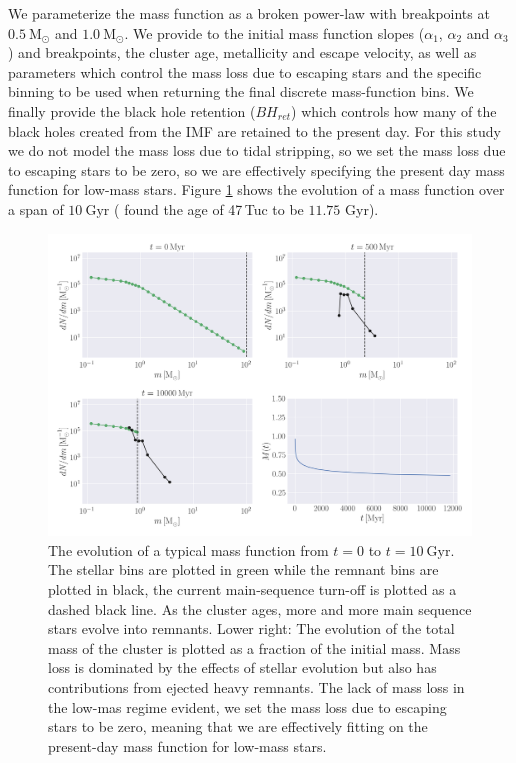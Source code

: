 We parameterize the mass function as a broken power-law with breakpoints at $0.5 \ \mathrm{M}_\odot$
and $1.0 \ \mathrm{M}_\odot$. We provide to \evolvemf{} the initial mass function slopes
($\alpha_1$, $\alpha_2$ and $\alpha_3$) and breakpoints, the cluster age, metallicity and escape
velocity, as well as parameters which control the mass loss due to escaping stars and the specific
binning to be used when returning the final discrete mass-function bins. We finally provide the
black hole retention ($BH_{ret}$) which controls how many of the black holes created from the IMF are
retained to the present day. For this study we do not model the mass loss due to tidal stripping, so
we set the mass loss due to escaping stars to be zero, so we are effectively specifying the present
day mass function for low-mass stars. Figure \ref{fig:2/evolve_mf} shows the evolution of a mass
function over a span of $10 \ \mathrm{Gyr}$ (\citealt{Baumgardt2017a} found the age of 47\,Tuc to be
$11.75$ Gyr).

\begin{figure}
    \centering
    \includegraphics[width=\textwidth]{figures/evolve_mf.png}
    \caption{The evolution of a typical mass function from $t=0$ to $t=10 \ \mathrm{Gyr}$. The
        stellar bins are plotted in green while the remnant bins are plotted in black, the current
        main-sequence turn-off is plotted as a dashed black line. As the cluster ages, more and more
        main sequence stars evolve into remnants. Lower right: The evolution of the total mass of
        the cluster is plotted as a fraction of the initial mass. Mass loss is dominated by the
        effects of stellar evolution but also has contributions from ejected heavy remnants. The
        lack of mass loss in the low-mas regime evident, we set the mass loss due to escaping stars
to be zero, meaning that we are effectively fitting on the present-day mass function for
low-mass stars.}
    \label{fig:2/evolve_mf}
\end{figure}


